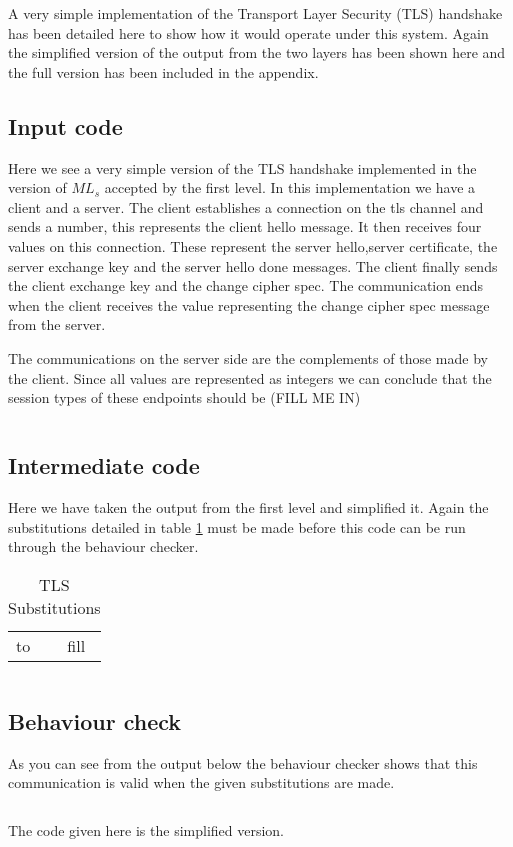 A very simple implementation of the Transport Layer Security (TLS) handshake has been detailed here to show how it would operate under this system. Again the simplified version of the output from the two layers has been shown here and the full version has been included in the appendix. 

\subsection{Input code}

Here we see a very simple version of the TLS handshake implemented in the version of $ML_s$ accepted by the first level. In this implementation we have a client and a server. The client establishes a connection on the tls channel and sends a number, this represents the client hello message. It then receives four values on this connection. These represent the server hello,server certificate, the server exchange key and the server hello done messages. The client finally sends the client exchange key and the change cipher spec. The communication ends when the client receives the value representing the change cipher spec message from the server. 

The communications on the server side are the complements of those made by the client. Since all values are represented as integers we can conclude that the session types of these endpoints should  be (FILL ME IN) %

\begin{lstlisting}
\end{lstlisting}

\subsection{Intermediate code}
Here we have taken the output from the first level and simplified it. Again the substitutions detailed in table \ref{tLSSubs} must be made before this code can be run through the behaviour checker. 

\begin{table}
\centering
\begin{tabular}{l c}
to & fill \\
\end{tabular}
\caption{TLS Substitutions}
\label{tLSSubs}
\end{table}

\begin{lstlisting}
\end{lstlisting}

\subsection{Behaviour check}

As you can see from the output below the behaviour checker shows that this communication is valid when the given substitutions are made. 

\begin{lstlisting}
\end{lstlisting}

The code given here is the simplified version. 